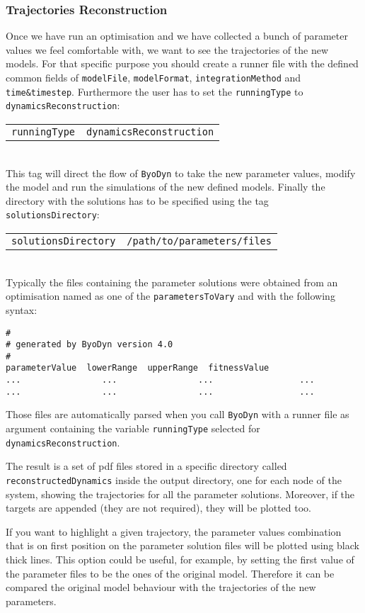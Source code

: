 \documentclass[a4paper, 11pt]{article}
\begin{document}
\subsubsection{Trajectories Reconstruction}
Once we have run an optimisation and we have collected a bunch of parameter values we feel comfortable with, we want to see the trajectories of the new models.
For that specific purpose you should create a runner file with the defined common fields of \texttt{modelFile}, \texttt{modelFormat}, \texttt{integrationMethod} and \texttt{time\&timestep}.
Furthermore the user has to set the \texttt{runningType} to \texttt{dynamicsReconstruction}:\\[1.5ex]
\begin{tabular}{cc}\texttt{runningType}&\texttt{dynamicsReconstruction}\end{tabular}\\[1.5ex]
This tag will direct the flow of \texttt{ByoDyn} to take the new parameter values, modify the model and run the simulations of the new defined models.
Finally the directory with the solutions has to be specified using the tag \texttt{solutionsDirectory}:\\[1.5ex]
\begin{tabular}{cc}\texttt{solutionsDirectory}&\texttt{/path/to/parameters/files}\end{tabular}\\[1.5ex]
Typically the files containing the parameter solutions were obtained from an optimisation named as one of the \texttt{parametersToVary} and with the following syntax:
\begin{verbatim}
#
# generated by ByoDyn version 4.0
#
parameterValue	lowerRange	upperRange	fitnessValue
...                ...                ...                 ...
...                ...                ...                 ...
\end{verbatim}
Those files are automatically parsed when you call \texttt{ByoDyn} with a runner file as argument containing the variable \texttt{runningType} selected for \texttt{dynamicsReconstruction}.

The result is a set of pdf files stored in a specific directory called \texttt{reconstructedDynamics} inside the  output directory, one for each node of the system, showing the trajectories for all the parameter solutions.
Moreover, if the targets are appended (they are not required), they will be plotted too.

If you want to highlight a given trajectory, the parameter values combination that is on first position on the parameter solution files will be plotted using black thick lines.
This option could be useful, for example, by setting the first value of the parameter files to be the ones of the original model.
Therefore it can be compared the original model behaviour with the trajectories of the new parameters.
  
\end{document}
